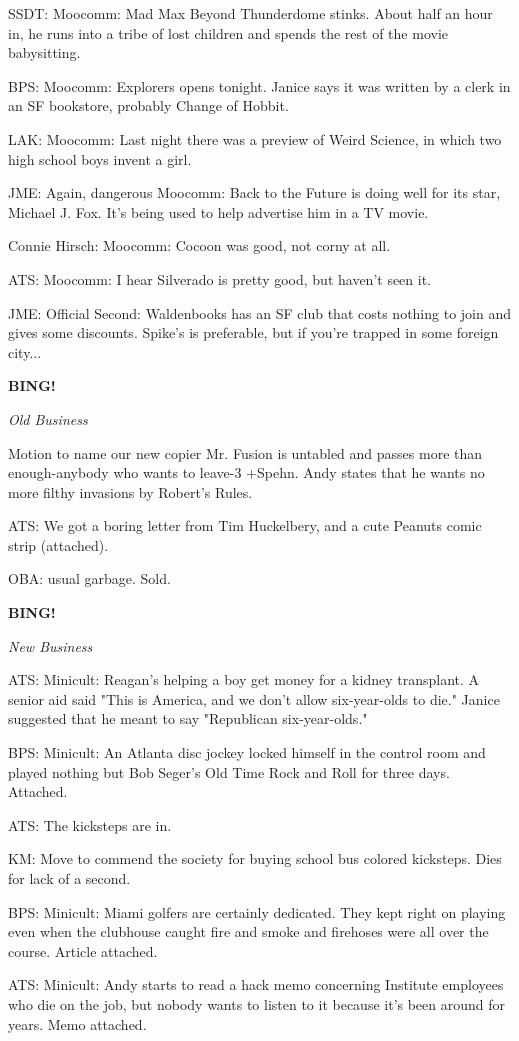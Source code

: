 \documentclass[12pt]{article}
\newcommand{\bing}{{\bf BING!} }
\newcommand{\goto}[1]{\bing \vskip 12pt \centerline{{\em{#1}}}}
\begin{document}
SSDT: Moocomm: Mad Max Beyond Thunderdome stinks. About half an hour in, he runs into a tribe of lost children and spends the rest of the movie babysitting.

BPS: Moocomm: Explorers opens tonight. Janice says it was written by a clerk in an SF bookstore, probably Change of Hobbit.

LAK: Moocomm: Last night there was a preview of Weird Science, in which two high school boys invent a girl.

JME: Again, dangerous Moocomm: Back to the Future is doing well for its star, Michael J. Fox. It's being used to help advertise him in a TV movie.

Connie Hirsch: Moocomm: Cocoon was good, not corny at all.

ATS: Moocomm: I hear Silverado is pretty good, but haven't seen it.

JME: Official Second: Waldenbooks has an SF club that costs nothing to join and gives some discounts. Spike's is preferable, but if you're trapped in some foreign city...

\goto{Old Business}

Motion to name our new copier Mr. Fusion is untabled and passes more than enough-anybody who wants to leave-3 +Spehn. Andy states that he wants no more filthy invasions by Robert's Rules.

ATS: We got a boring letter from Tim Huckelbery, and a cute Peanuts comic strip (attached).

OBA: usual garbage. Sold.

\goto{New Business}

ATS: Minicult: Reagan's helping a boy get money for a kidney transplant. A senior aid said "This is America, and we don't allow six-year-olds to die." Janice suggested that he meant to say "Republican six-year-olds."

BPS: Minicult: An Atlanta disc jockey locked himself in the control room and played nothing but Bob Seger's Old Time Rock and Roll for three days. Attached.

ATS: The kicksteps are in.

KM: Move to commend the society for buying school bus colored kicksteps. Dies for lack of a second.

BPS: Minicult: Miami golfers are certainly dedicated. They kept right on playing even when the clubhouse caught fire and smoke and firehoses were all over the course. Article attached.

ATS: Minicult: Andy starts to read a hack memo concerning Institute employees who die on the job, but nobody wants to listen to it because it's been around for years. Memo attached.
\end{document}
